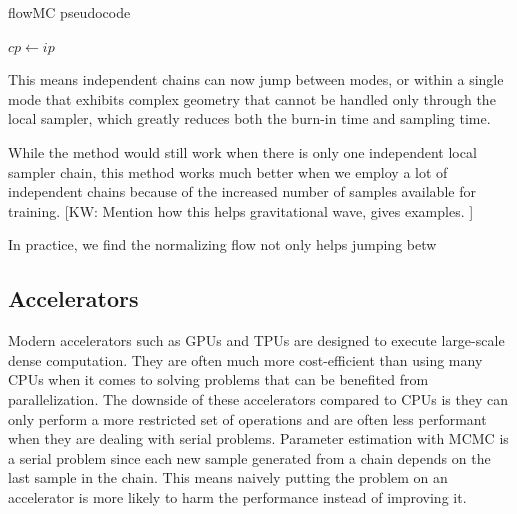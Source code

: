 \documentclass[twocolumn]{aastex631}
\newcommand{\kw}[1]{{\color{rb4}[KW: #1 ]}}
\begin{document}
\begin{algorithm}
\caption{flowMC pseudocode}\label{alg:cap}
$cp \leftarrow ip$\\

\end{algorithm}

This means independent chains can now jump between modes, or within a single
mode that exhibits complex geometry that cannot be handled only through the
local sampler, which greatly reduces both the burn-in time and sampling time.

While the method would still work when there is only one independent local
sampler chain, this method works much better when we employ a lot of independent
chains because of the increased number of samples available for training. 
\kw{Mention how this helps gravitational wave, gives examples.}

In practice, we find the normalizing flow not only helps jumping betw

\subsection{Accelerators}
\label{sec:accelerators}

Modern accelerators such as GPUs and TPUs are designed to execute large-scale
dense computation. They are often much more cost-efficient than using many CPUs
when it comes to solving problems that can be benefited from parallelization.
The downside of these accelerators compared to CPUs is they can only perform a
more restricted set of operations and are often less performant when they are
dealing with serial problems. Parameter estimation with MCMC is a serial
problem since each new sample generated from a chain depends on the last sample
in the chain. This means naively putting the problem on an accelerator is more
likely to harm the performance instead of improving it.
\end{document}
